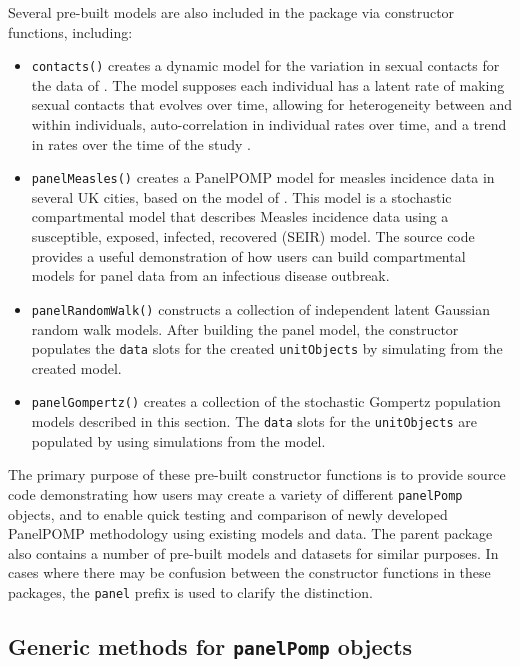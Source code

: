 Several pre-built models are also included in the package via constructor functions, including:

\begin{itemize}
\tightlist
\item
  \texttt{contacts()} creates a dynamic model for the variation in sexual contacts for the data of \citet{vittinghoff99}.
  The model supposes each individual has a latent rate of making sexual contacts that evolves over time, allowing for heterogeneity between and within individuals, auto-correlation in individual rates over time, and a trend in rates over the time of the study \citep{romero-severson15}.
\item
  \texttt{panelMeasles()} creates a PanelPOMP model for measles incidence data in several UK cities, based on the model of \citet{he10}.
  This model is a stochastic compartmental model that describes Measles incidence data using a susceptible, exposed, infected, recovered (SEIR) model.
  The source code provides a useful demonstration of how users can build compartmental models for panel data from an infectious disease outbreak.
\item
  \texttt{panelRandomWalk()} constructs a collection of independent latent Gaussian random walk models. After building the panel model, the constructor populates the \texttt{data} slots for the created \texttt{unitObjects} by simulating from the created model.
\item
  \texttt{panelGompertz()} creates a collection of the stochastic Gompertz population models described in this section. The \texttt{data} slots for the \texttt{unitObjects} are populated by using simulations from the model.
\end{itemize}

The primary purpose of these pre-built constructor functions is to provide source code demonstrating how users may create a variety of different \texttt{panelPomp} objects, and to enable quick testing and comparison of newly developed PanelPOMP methodology using existing models and data.
The parent  package also contains a number of pre-built models and datasets for similar purposes.
In cases where there may be confusion between the constructor functions in these packages, the \texttt{panel} prefix is used to clarify the distinction.

\subsection{\texorpdfstring{Generic methods for \texttt{panelPomp} objects}{Generic methods for panelPomp objects}}\label{generic-methods-for-panelpomp-objects}

